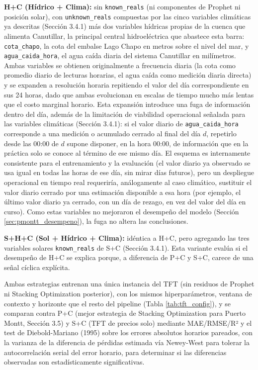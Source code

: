 \textbf{H+C (Hídrico + Clima):} sin \texttt{known\_reals} (ni componentes de Prophet ni posición solar), con \texttt{unknown\_reals} compuestas por las cinco variables climáticas ya descritas (Sección 3.4.1) más dos variables hídricas propias de la cuenca que alimenta Canutillar, la principal central hidroeléctrica que abastece esta barra: \texttt{cota\_chapo}, la cota del embalse Lago Chapo en metros sobre el nivel del mar, y \texttt{agua\_caida\_hora}, el agua caída diaria del sistema Canutillar en milímetros. Ambas variables se obtienen originalmente a frecuencia diaria (la cota como promedio diario de lecturas horarias, el agua caída como medición diaria directa) y se expanden a resolución horaria repitiendo el valor del día correspondiente en sus 24 horas, dado que ambas evolucionan en escalas de tiempo mucho más lentas que el costo marginal horario. Esta expansión introduce una fuga de información dentro del día, además de la limitación de viabilidad operacional señalada para las variables climáticas (Sección 3.4.1): si el valor diario de \texttt{agua\_caida\_hora} corresponde a una medición o acumulado cerrado al final del día $d$, repetirlo desde las 00:00 de $d$ supone disponer, en la hora 00:00, de información que en la práctica solo se conoce al término de ese mismo día. El esquema es internamente consistente para el entrenamiento y la evaluación (el valor diario ya observado se usa igual en todas las horas de ese día, sin mirar días futuros), pero un despliegue operacional en tiempo real requeriría, análogamente al caso climático, sustituir el valor diario cerrado por una estimación disponible a esa hora (por ejemplo, el último valor diario ya cerrado, con un día de rezago, en vez del valor del día en curso). Como estas variables no mejoraron el desempeño del modelo (Sección \ref{sec:pmontt_desempeno}), la fuga no altera las conclusiones.

\textbf{S+H+C (Sol + Hídrico + Clima):} idéntica a H+C, pero agregando las tres variables solares \texttt{known\_reals} de S+C (Sección 3.4.1). Esta variante evalúa si el desempeño de H+C se explica porque, a diferencia de P+C y S+C, carece de una señal cíclica explícita.

Ambas estrategias entrenan una única instancia del TFT (sin residuos de Prophet ni Stacking Optimization posterior), con los mismos hiperparámetros, ventana de contexto y horizonte que el resto del pipeline (Tabla \ref{tab:tft_config}), y se comparan contra P+C (mejor estrategia de Stacking Optimization para Puerto Montt, Sección 3.5) y S+C (TFT de precios solo) mediante MAE/RMSE/R² y el test de Diebold-Mariano (1995) sobre los errores absolutos horarios pareados, con la varianza de la diferencia de pérdidas estimada vía Newey-West para tolerar la autocorrelación serial del error horario, para determinar si las diferencias observadas son estadísticamente significativas.

